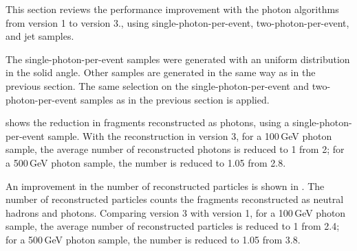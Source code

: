 This section reviews the performance improvement with the photon algorithms  from \pandora version 1 to version 3., using single-photon-per-event, two-photon-per-event, and jet samples. 



The single-photon-per-event samples were generated with an uniform distribution in the solid angle. Other samples are generated in the same way as in the previous section. The same selection on the  single-photon-per-event and  two-photon-per-event samples as in the previous section is applied.

 shows the reduction in fragments reconstructed as photons, using a single-photon-per-event sample. With the reconstruction in \pandora version 3, for a 100\,GeV photon sample, the average number of reconstructed photons is reduced to 1 from 2; for a 500\,GeV photon sample, the  number is reduced to 1.05 from 2.8.



An  improvement in the number of reconstructed particles is shown in . The number of  reconstructed particles counts the fragments reconstructed as neutral hadrons and photons.  Comparing \pandora version 3 with version 1, for a 100\,GeV photon sample, the average number of reconstructed particles is reduced to 1 from 2.4; for a 500\,GeV photon sample, the number is reduced to 1.05 from 3.8.



